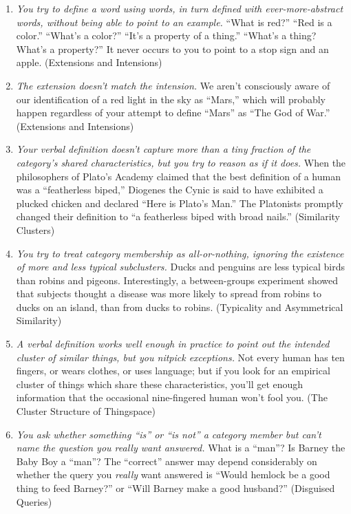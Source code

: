 \begin{enumerate}
\item {
 \textit{You try to define a word using words, in turn defined with
ever-more-abstract words, without being able to point to an example.}
``What is red?''
``Red is a color.''
``What's a color?''
``It's a property of a
thing.'' ``What's a
thing? What's a property?'' It never
occurs to you to point to a stop sign and an apple. (Extensions and
Intensions)}

\item {
 \textit{The extension doesn't match the
intension.} We aren't consciously aware of our
identification of a red light in the sky as
``Mars,'' which will probably happen
regardless of your attempt to define
``Mars'' as ``The
God of War.'' (Extensions and Intensions)}

\item {
 \textit{Your verbal definition doesn't capture
more than a tiny fraction of the category's shared
characteristics, but you try to reason as if it does.} When the
philosophers of Plato's Academy claimed that the best
definition of a human was a ``featherless
biped,'' Diogenes the Cynic is said to have exhibited
a plucked chicken and declared ``Here is
Plato's Man.'' The Platonists
promptly changed their definition to ``a featherless
biped with broad nails.'' (Similarity Clusters)}

\item {
 \textit{You try to treat category membership as all-or-nothing,
ignoring the existence of more and less typical subclusters.} Ducks and
penguins are less typical birds than robins and pigeons. Interestingly,
a between-groups experiment showed that subjects thought a disease was
more likely to spread from robins to ducks on an island, than from
ducks to robins. (Typicality and Asymmetrical Similarity)}

\item {
 \textit{A verbal definition works well enough in practice to point
out the intended cluster of similar things, but you nitpick
exceptions.} Not every human has ten fingers, or wears clothes, or uses
language; but if you look for an empirical cluster of things which
share these characteristics, you'll get enough
information that the occasional nine-fingered human
won't fool you. (The Cluster Structure of Thingspace)}

\item {
 \textit{You ask whether something
``is'' or ``is
not'' a category member but can't
name the question you really want answered.} What is a
``man''? Is Barney the Baby Boy a
``man''? The
``correct'' answer may depend
considerably on whether the query you \textit{really} want answered is
``Would hemlock be a good thing to feed
Barney?'' or ``Will Barney make a
good husband?'' (Disguised Queries)}


\end{enumerate}
